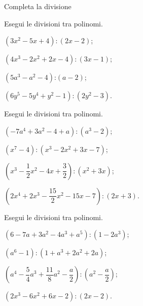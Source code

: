 \begin{esercizio}
\label{ese:11.24}
Completa la divisione
\begin{center}
 
\end{center}
\end{esercizio}

\begin{esercizio}[\Ast]
\label{ese:11.25}
Esegui le divisioni tra polinomi.
\begin{multicols}{2}
 \begin{enumeratea}
 \item $\left(3x^{2}-5x+4\right):\left(2x-2\right)$;
 \item $\left(4x^{3}-2x^{2}+2x-4\right):\left(3x-1\right)$;
 \item $\left(5a^{3}-a^{2}-4\right)\text{:}\left(a-2\right)$;
 \item $\left(6y^{5}-5y^{4}+y^{2}-1\right):\left(2y^{2}-3\right)$.
 \end{enumeratea}
\end{multicols}
\end{esercizio}

\begin{esercizio}[\Ast]
\label{ese:11.26}
Esegui le divisioni tra polinomi.
 \begin{enumeratea}
 \item $\left(-7a^{4}+3a^{2}-4+a\right):\left(a^{3}-2\right)$;
 \item $\left(x^{7}-4\right):\left(x^{3}-2x^{2}+3x-7\right)$;
 \item $\left(x^{3}-\dfrac{1}{2}x^{2}-4x+\dfrac{3}{2}\right):\left(x^{2}+3x\right)$;
 \item $\left(2x^{4}+2x^{3}-\dfrac{15}{2}x^{2}-15x-7\right):(2x+3)$.
 \end{enumeratea}
\end{esercizio}

\begin{esercizio}[\Ast]
\label{ese:11.27}
Esegui le divisioni tra polinomi.
 \begin{enumeratea}
 \item $\left(6-7a+3a^{2}-4a^{3}+a^{5}\right):\left(1-2a^{3}\right)$;
 \item $(a^{6}-1):(1+a^{3}+2a^{2}+2a)$;
 \item $\left(a^{4}-\dfrac{5}{4}a^{3}+\dfrac{11}{8}a^{2}-\dfrac{a}{2}\right):\left(a^{2}-\dfrac{a}{2}\right)$;
 \item $\left(2x^{3}-6x^{2}+6x-2\right):\left(2x-2\right)$.
 \end{enumeratea}
\end{esercizio}

